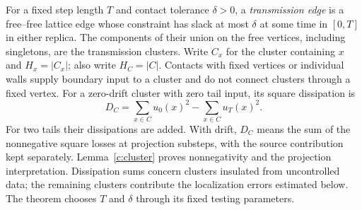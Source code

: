 For a fixed step length $T$ and contact tolerance $\delta>0$, a
\emph{transmission edge} is a free--free lattice edge whose constraint
has slack at most $\delta$ at some time in $[0,T]$ in either replica.
The components of their union on the free vertices, including
singletons, are the transmission clusters. Write $C_x$ for the
cluster containing $x$ and $H_x=|C_x|$; also write $H_C=|C|$.
Contacts with fixed vertices or individual walls supply boundary
input to a cluster and do not connect clusters through a fixed
vertex. For a zero-drift cluster with zero tail input, its square
dissipation is
\[
 D_C=\sum_{x\in C}u_0(x)^2-\sum_{x\in C}u_T(x)^2.
\]
For two tails their dissipations are added. With drift, $D_C$ means
the sum of the nonnegative square losses at projection substeps,
with the source contribution kept separately. Lemma~\ref{c:cluster}
proves nonnegativity and the projection interpretation. Dissipation
sums concern clusters insulated from uncontrolled data; the
remaining clusters contribute the localization errors estimated
below. The theorem chooses $T$ and $\delta$ through its fixed
testing parameters.

